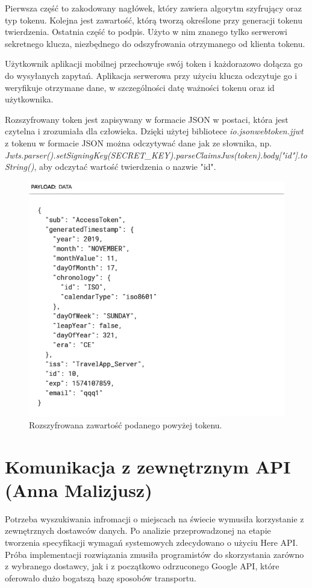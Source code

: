 \documentclass[10pt,twoside,a4paper]{report}
\begin{document}
\par Pierwsza część to zakodowany nagłówek, który zawiera algorytm szyfrujący oraz typ tokenu. 
Kolejna jest zawartość, którą tworzą określone przy generacji tokenu twierdzenia. Ostatnia część to podpis. Użyto w nim znanego tylko serwerowi sekretnego klucza, niezbędnego do odszyfrowania otrzymanego od klienta tokenu.
\par Użytkownik aplikacji mobilnej przechowuje swój token i każdorazowo dołącza go do wysyłanych zapytań. Aplikacja serwerowa przy użyciu klucza odczytuje go i weryfikuje otrzymane dane, w szczególności datę ważności tokenu oraz id użytkownika.

\par Rozszyfrowany token jest zapisywany w formacie JSON w postaci, która jest czytelna i zrozumiała dla człowieka. Dzięki użytej bibliotece \textit{io.jsonwebtoken.jjwt} z tokenu w formacie JSON można odczytywać dane jak ze słownika, np.
\textit{Jwts.parser().setSigningKey(SECRET\_KEY).parseClaimsJws(token).body["id"].toString()}, aby odczytać wartość twierdzenia o nazwie "id".

\begin{figure}[h]
\centering
\includegraphics[width=\linewidth]{tokenPayload}
\caption{Rozszyfrowana zawartość podanego powyżej tokenu.}
\label{fig:tokenPayload}
\end{figure}


\section{Komunikacja z zewnętrznym API (Anna Malizjusz)}
\par Potrzeba wyszukiwania infromacji o miejscach na świecie wymusiła korzystanie z zewnętrznych dostawców danych. Po analizie przeprowadzonej na etapie tworzenia specyfikacji wymagań systemowych zdecydowano o użyciu Here API\cite{HereApi}. Próba implementacji rozwiązania zmusiła programistów do skorzystania zarówno z wybranego dostawcy, jak i z początkowo odrzuconego Google API\cite{GoogleApi}, które oferowało dużo bogatszą bazę sposobów transportu.
\end{document}
